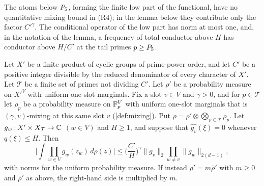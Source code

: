 The atoms below $P_5$, forming the finite low part of the functional,
have no quantitative mixing bound in (R4); in the lemma below they contribute
only the factor $C'^{\gamma}$. The conditional operator of the low part
has norm at most one, and, in the notation of the lemma, a frequency of
total conductor above $H$ has conductor above $H/C'$ at the tail primes
$p\ge P_5$.

\begin{lemma}
\label{lem:record:prefix-conductor}
Let $X'$ be a finite product of cyclic groups of prime-power order, and let $C'$
be a positive integer divisible by the reduced denominator of every character
of $X'$. Let $\mathcal T$ be a finite set of primes not dividing $C'$. Let
$\rho'$ be a probability measure on $X'^V$ with uniform one-slot marginals. Fix a slot $v\in V$ and $\gamma>0$, and for $p\in\mathcal T$ let $\rho_p$ be a probability measure on $\mathbb F_p^V$ with uniform one-slot marginals that is $(\gamma,v)$-mixing at this same slot $v$ (\cref{def:mixing}). Put
$\rho=\rho'\otimes\bigotimes_{p\in\mathcal T}\rho_p$. Let
$g_w\colon X'\times X_{\mathcal T}\to\mathbb C$ $(w\in V)$ and $H\ge1$, and suppose that
$\widehat{g_v}(\xi)=0$ whenever $q(\xi)\le H$. Then
\[
 \Big|\int\prod_{w\in V}g_w(z_w)\,d\rho(z)\Big|
 \le\Big(\frac{C'}{H}\Big)^{\gamma}\|g_v\|_2\prod_{w\ne v}\|g_w\|_{2(d-1)},
\]
with norms for the uniform probability measure. If instead $\rho'=m\bar\rho'$
with $m\ge0$ and $\bar\rho'$ as above, the right-hand side is multiplied by $m$.
\end{lemma}

